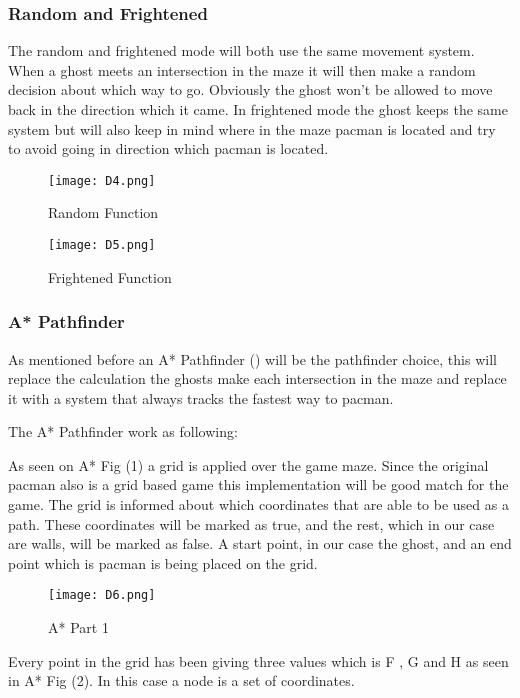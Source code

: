 \subsubsection{Random and Frightened}
The random and frightened mode will both use the same movement system. When a ghost meets an intersection in the maze it will then make a random decision about which way to go. Obviously the ghost won’t be allowed to move back in the direction which it came. In frightened mode the ghost keeps the same system but will also keep in mind where in the maze pacman is located and try to avoid going in direction which pacman is located.


\begin{figure}[!htbp]
\centering
\texttt{[image: D4.png]}
\caption{ Random Function }
\label{fig:Random}
\end{figure}

\begin{figure}[!htbp]
\centering
\texttt{[image: D5.png]}
\caption{ Frightened Function }
\label{fig:Frightened}
\end{figure}

\subsubsection{A* Pathfinder}
As mentioned before an A* Pathfinder (\autocite{Boris}) will be the pathfinder choice, this will replace the calculation the ghosts make each intersection in the maze and replace it with a system that always tracks the fastest way to pacman.

The A* Pathfinder work as following:

As seen on A* Fig (1) a grid is applied over the game maze. Since the original pacman also is a grid based game this implementation will be good match for the game. The grid is informed about which coordinates that are able to be used as a path. These coordinates will be marked as true, and the rest, which in our case are walls, will be marked as false. A start point, in our case the ghost, and an end point which is pacman is being placed on the grid.


\begin{figure}[!htbp]
\centering
\texttt{[image: D6.png]}
\caption{ A* Part 1 }
\label{fig:A1}
\end{figure}

Every point in the grid has been giving three values which is F , G and H as seen in A* Fig (2). In this case a node is a set of coordinates.

